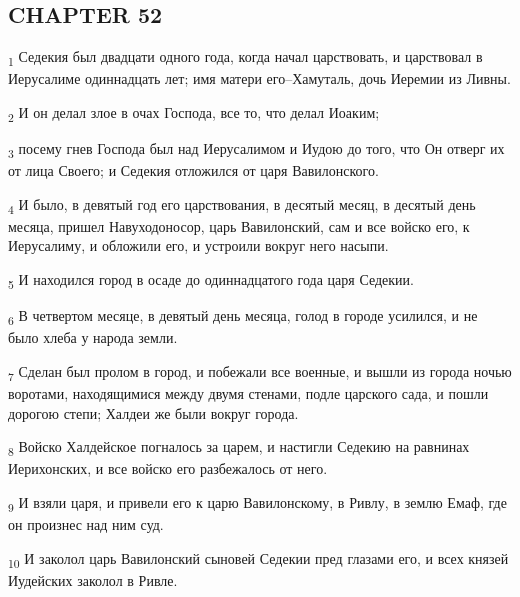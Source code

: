 \subsection{CHAPTER 52}
\begin{tcolorbox}
\textsubscript{1} Седекия был двадцати одного года, когда начал царствовать, и царствовал в Иерусалиме одиннадцать лет; имя матери его--Хамуталь, дочь Иеремии из Ливны.
\end{tcolorbox}
\begin{tcolorbox}
\textsubscript{2} И он делал злое в очах Господа, все то, что делал Иоаким;
\end{tcolorbox}
\begin{tcolorbox}
\textsubscript{3} посему гнев Господа был над Иерусалимом и Иудою до того, что Он отверг их от лица Своего; и Седекия отложился от царя Вавилонского.
\end{tcolorbox}
\begin{tcolorbox}
\textsubscript{4} И было, в девятый год его царствования, в десятый месяц, в десятый день месяца, пришел Навуходоносор, царь Вавилонский, сам и все войско его, к Иерусалиму, и обложили его, и устроили вокруг него насыпи.
\end{tcolorbox}
\begin{tcolorbox}
\textsubscript{5} И находился город в осаде до одиннадцатого года царя Седекии.
\end{tcolorbox}
\begin{tcolorbox}
\textsubscript{6} В четвертом месяце, в девятый день месяца, голод в городе усилился, и не было хлеба у народа земли.
\end{tcolorbox}
\begin{tcolorbox}
\textsubscript{7} Сделан был пролом в город, и побежали все военные, и вышли из города ночью воротами, находящимися между двумя стенами, подле царского сада, и пошли дорогою степи; Халдеи же были вокруг города.
\end{tcolorbox}
\begin{tcolorbox}
\textsubscript{8} Войско Халдейское погналось за царем, и настигли Седекию на равнинах Иерихонских, и все войско его разбежалось от него.
\end{tcolorbox}
\begin{tcolorbox}
\textsubscript{9} И взяли царя, и привели его к царю Вавилонскому, в Ривлу, в землю Емаф, где он произнес над ним суд.
\end{tcolorbox}
\begin{tcolorbox}
\textsubscript{10} И заколол царь Вавилонский сыновей Седекии пред глазами его, и всех князей Иудейских заколол в Ривле.
\end{tcolorbox}
